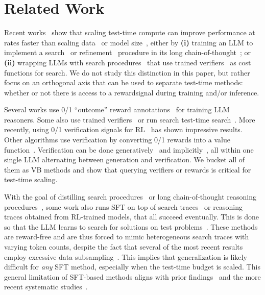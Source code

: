 \vspace{-0.2cm}
\section{Related Work}
\label{sec:relwork}
\vspace{-0.15cm}
Recent works~\cite{sardana2023beyond,snell2024scaling} show that scaling test-time compute can improve performance at rates faster than scaling data~\cite{li2024common} or model size~\cite{hoffmann2022training}, either by \textbf{(i)} training an LLM to implement a search~\cite{yao2023tree,gandhi2024stream} or refinement~\citep{kumar2024training,qu2024recursive} procedure in its long chain-of-thought~\citep{deepseekai2025deepseekr1incentivizingreasoningcapability,deepscaler2025,MoonshotAI}; or \textbf{(ii)} wrapping LLMs with search procedures~\cite{wu2024inference,beeching2024scalingtesttimecompute} that use trained verifiers~\cite{cobbe2021gsm8k,setlur2024rewarding} as cost functions for search. We do not study this distinction in this paper, but rather focus on an orthogonal axis that can be used to separate test-time methods: whether or not there is access to a rewardsignal during training and/or inference.

Several works use 0/1 ``outcome'' reward annotations~\cite{uesato2022solving,bi2024deepseek} for training LLM reasoners. Some also use trained verifiers~\cite{hosseini2024v} or run search test-time search~\cite{welleck2024decoding,chen2024more}. More recently, using 0/1 verification signals for RL~\citep{MoonshotAI,deepseekai2025deepseekr1incentivizingreasoningcapability,deepscaler2025} has shown impressive results. Other  algorithms use verification by converting 0/1 rewards into a value function~\cite{rafailov2023direct,zelikman2022star,singh2023beyond,setlur2024rl}. Verification can be done generatively~\cite{zhang2024generative,mahan2024generative} and implicitly~\cite{yuan2024implicitprm,cui2025processreinforcementimplicitrewards}, all within one single LLM alternating between generation and verification. We bucket all of them as VB methods and show that querying verifiers or rewards is critical for test-time scaling.

With the goal of distilling search procedures~\citep{yang2022chain,xie2024monte,lehnert2024beyond,gandhi2024stream} or long chain-of-thought reasoning procedures~\citep{muennighoff2025s1,openthoughts}, some work also runs SFT on top of search traces~\cite{gandhi2024stream,nie2024evolve} or reasoning traces obtained from RL-trained models, that all succeed eventually. This is done so that the LLM learns to search for solutions on test problems~\cite{sel2023algorithm}. 
These methods are reward-free and are thus forced to mimic heterogeneous search traces with varying token counts, despite the fact that several of the most recent results employ excessive data subsampling~\citep{muennighoff2025s1,ye2025limo}.
This implies that generalization is likely difficult for \emph{any} SFT method, especially when the test-time budget is scaled. This general limitation of SFT-based methods aligns with prior findings~\citep{kumar2024training,xiang2025towards} and the more recent systematic studies~\citep{chu2025sft}. 

